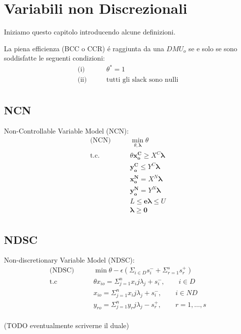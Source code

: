 \chapter{Variabili non Discrezionali} \label{CAP:cinque}
\bigskip
Iniziamo questo capitolo introducendo alcune definizioni.
\begin{definiz}
La piena efficienza (BCC o CCR) \'e raggiunta da una $DMU_o$ se e solo se sono soddisfatte le seguenti condizioni:
\begin{equation}
\begin{split}
\text{(i) } \qquad &  \theta^* = 1 \\
\text{(ii)} \qquad & \text{tutti gli slack sono nulli}\\
\end{split}
\end{equation}
\end{definiz}
\section{NCN}
\begin{definiz} Non-Controllable Variable Model (NCN):
\begin{equation}
\begin{split}
\text{(NCN)} \qquad & \min_{\theta, \boldsymbol{\lambda}} \theta \\
\text{t.c.} \qquad & \theta \boldsymbol{x^C_o} \geq X^C\boldsymbol{\lambda} \\
& \boldsymbol{y^C_o} \leq Y^C\boldsymbol{\lambda} \\
& \boldsymbol{x^N_o} = X^N\boldsymbol{\lambda} \\
& \boldsymbol{y^N_o} = Y^N\boldsymbol{\lambda} \\
& L \leq \boldsymbol{e\lambda} \leq U \\
& \boldsymbol{\lambda} \geq \boldsymbol{0} \\
\end{split}
\end{equation}
\end{definiz}
\section{NDSC}
\begin{definiz} Non-discretionary Variable Model (NDSC):
\begin{equation}
\begin{split}
\text{(NDSC)} \qquad & \min \theta - \epsilon(\Sigma_{i \in D} s^-_i + \Sigma^s_{r=1} s^+_r) \\
\text{t.c} \qquad &  \theta x_{io} = \Sigma^n_{j=1}x_ij\lambda_j + s^-_i, \qquad i \in D \\
& x_{io} = \Sigma^n_{j=1}x_ij\lambda_j + s^-_i, \qquad i \in ND \\
& y_{ro} = \Sigma^n_{j=1}y_rj\lambda_j - s^+_r, \qquad r = 1,\dots, s \\
\end{split}
\end{equation}
\end{definiz}
(TODO eventualmente scriverne il duale)
